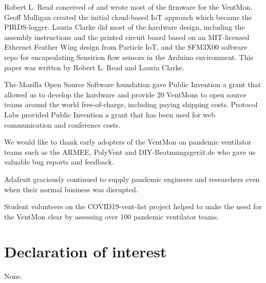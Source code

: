 \documentclass[11pt, letterpaper]{article}
\begin{document}
Robert L. Read conceived of and wrote most of the firmware for the VentMon. Geoff Mulligan created the initial cloud-based IoT approach which became the PIRDS-logger. Lauria Clarke did most of the hardware design, including the assembly instructions and the printed circuit board based on an MIT-licensed Ethernet Feather Wing design from Particle IoT\cite{particleefw}, and the SFM3X00 software repo for encapsulating Sensirion flow sensors in the Arduino environment. This paper was written by Robert L. Read and Lauria Clarke.

The Mozilla Open Source Software foundation gave Public Invention a grant that allowed us to develop the hardware and provide 20 VentMons to open source teams around the world free-of-charge, including paying shipping costs. Protocol Labs provided Public Invention a grant that has been used for web communication and conference costs.

We would like to thank early adopters of the VentMon on pandemic ventilator teams such as the ARMEE\cite{ARMEE}, PolyVent\cite{polyvent} and DIY-Beatmungsgerät.de\cite{beatmung} who gave us valuable bug reports and feedback.

Adafruit graciously continued to supply pandemic engineers and researchers even when their normal business was disrupted.

Student volunteers on the COVID19-vent-list project\cite{COVID19VENTLIST} helped to make the need for the VentMon clear by assessing over 100 pandemic ventilator teams.

\section{Declaration of interest}

None.
\end{document}
